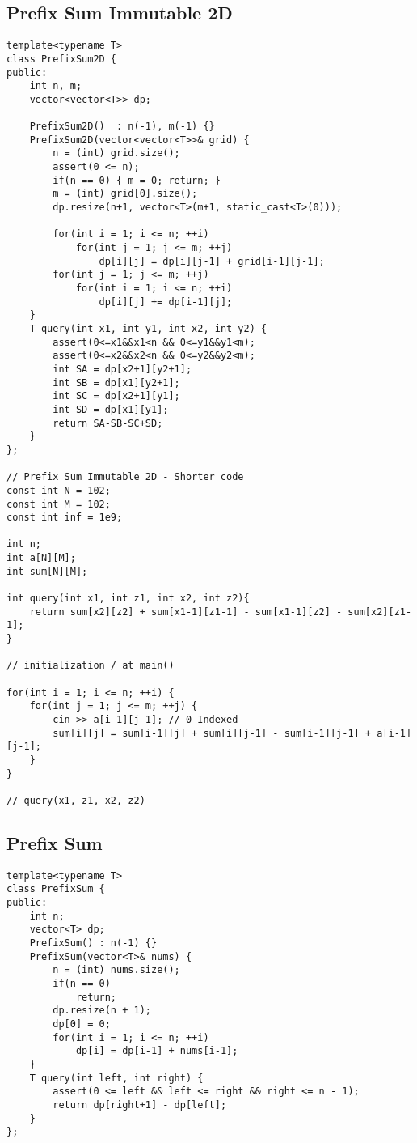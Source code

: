\documentclass[10pt,letterpaper,twocolumn,twosided]{article}
\begin{document}
\vfill

\subsection{Prefix Sum Immutable 2D}
\begin{lstlisting}
template<typename T>
class PrefixSum2D {
public:
    int n, m;
    vector<vector<T>> dp;

    PrefixSum2D()  : n(-1), m(-1) {}
    PrefixSum2D(vector<vector<T>>& grid) {
        n = (int) grid.size();
        assert(0 <= n);
        if(n == 0) { m = 0; return; }
        m = (int) grid[0].size();
        dp.resize(n+1, vector<T>(m+1, static_cast<T>(0)));
        
        for(int i = 1; i <= n; ++i)
            for(int j = 1; j <= m; ++j)
                dp[i][j] = dp[i][j-1] + grid[i-1][j-1];
        for(int j = 1; j <= m; ++j)
            for(int i = 1; i <= n; ++i)
                dp[i][j] += dp[i-1][j];
    }
    T query(int x1, int y1, int x2, int y2) {
        assert(0<=x1&&x1<n && 0<=y1&&y1<m);
        assert(0<=x2&&x2<n && 0<=y2&&y2<m);
        int SA = dp[x2+1][y2+1];
        int SB = dp[x1][y2+1];
        int SC = dp[x2+1][y1];
        int SD = dp[x1][y1];
        return SA-SB-SC+SD;
    }
};

// Prefix Sum Immutable 2D - Shorter code
const int N = 102;
const int M = 102;
const int inf = 1e9;

int n;
int a[N][M];
int sum[N][M];

int query(int x1, int z1, int x2, int z2){
    return sum[x2][z2] + sum[x1-1][z1-1] - sum[x1-1][z2] - sum[x2][z1-1];
}

// initialization / at main()

for(int i = 1; i <= n; ++i) {
    for(int j = 1; j <= m; ++j) {
        cin >> a[i-1][j-1]; // 0-Indexed
        sum[i][j] = sum[i-1][j] + sum[i][j-1] - sum[i-1][j-1] + a[i-1][j-1];
    }
}

// query(x1, z1, x2, z2)
\end{lstlisting}

\subsection{Prefix Sum}
\begin{lstlisting}
template<typename T>
class PrefixSum {
public:
    int n;
    vector<T> dp;
    PrefixSum() : n(-1) {}
    PrefixSum(vector<T>& nums) {
        n = (int) nums.size();
        if(n == 0)
            return;
        dp.resize(n + 1);
        dp[0] = 0;
        for(int i = 1; i <= n; ++i)
            dp[i] = dp[i-1] + nums[i-1];
    }
    T query(int left, int right) {
        assert(0 <= left && left <= right && right <= n - 1);
        return dp[right+1] - dp[left];
    }
};
\end{lstlisting}
\end{document}
